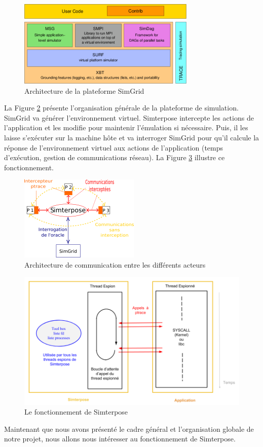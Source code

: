 \begin{figure}[H]
  \centering
  \includegraphics[scale=0.95]{Pictures/png/SimGrid}
  \caption{Architecture de la plateforme SimGrid}
  \label{SimGrid}
\end{figure}

La Figure \ref{Organisation_generale} présente l'organisation générale de la plateforme de simulation. SimGrid va générer l'environnement virtuel. Simterpose intercepte les
actions de l'application et les modifie pour maintenir l'émulation si
nécessaire. Puis, il les laisse
s'exécuter sur la machine hôte et va interroger SimGrid pour qu'il calcule la
réponse de l'environnement virtuel aux actions de l'application (temps d'exécution, gestion de communications réseau). La Figure \ref{Organisation_Simterpose} illustre ce fonctionnement.

\begin{figure}[H]
  \centering
  \includegraphics{Pictures/png/Communications_Simterpose_interprocess_v2}
  \caption{Architecture de communication entre les différents acteurs}
  \label{Organisation_generale}
\end{figure}

\begin{figure}[H]
  \centering
  \includegraphics[scale=0.5]{Pictures/png/Simterpose_orga_code_v4}
  \caption{Le fonctionnement de Simterpose}
  \label{Organisation_Simterpose}
\end{figure}

Maintenant que nous avons présenté le cadre général et l'organisation globale
de notre projet, nous allons nous intéresser au fonctionnement de Simterpose.
